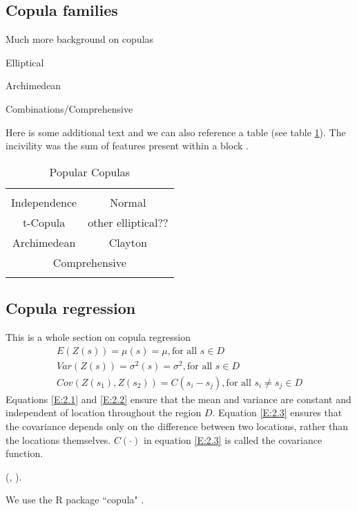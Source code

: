 \subsection*{Copula families}

Much more background on copulas

Elliptical

Archimedean

Combinations/Comprehensive

Here is some additional text and we can also reference a table (see table \ref{Ta:a_table}).  The incivility was the sum of features present within a block \cite{costa_case_2017}.

\begin{table}
\begin{center}
\caption{Popular Copulas}
\begin{tabular}{cc}
  \hline \\
Independence & Normal \\
t-Copula &other elliptical?? \\
Archimedean  &Clayton\\
\multicolumn{2}{c}{Comprehensive}\\ \\
  \hline
\end{tabular}
\label{Ta:a_table}
\end{center}
\end{table}


\subsection*{Copula regression}

This is a whole section on copula regression
\begin{gather}
E(Z(s))=\mu(s)=\mu,\text{for all }s \in D \label{E:2.1}\\
Var(Z(s))=\sigma^{2}(s)=\sigma^{2},\text{for all }s \in D \label{E:2.2}\\
Cov(Z(s_{1}),Z(s_{2}))=C(s_{i}-s_{j}),\text{for all }s_{i}\ne s_{j} \in D \label{E:2.3}
\end{gather}
Equations \ref{E:2.1} and \ref{E:2.2} ensure that the mean and variance are constant and independent of location throughout the region $D$. Equation \ref{E:2.3} ensures that the covariance depends only on the difference between two locations, rather than the locations themselves. $C(\cdot)$ in equation \ref{E:2.3} is called the covariance function.

 (\cite{smith_bayesian_nodate}, \cite{biswas_bayesian_2009}).  
 
 We use the R package ``copula" \cite{hofert_copula:_2016}. 
